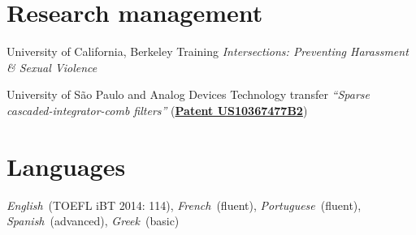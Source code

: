 \documentclass{cvlfoc}
\begin{document}
\section*{Research management}

\begin{entrydate}
		{University of California, Berkeley}
		{Training}
		{\emph{Intersections: Preventing Harassment \& Sexual Violence}}

		{University of S\~{a}o Paulo {\normalfont and} Analog Devices}
		{Technology transfer}
		{\emph{``Sparse cascaded-integrator-comb filters''}
		(\href{https://patents.google.com/patent/US10367477B2}{\textbf{Patent US10367477B2}})}
\end{entrydate}



\section*{Languages}

\textit{English}~(TOEFL iBT 2014: 114),
\textit{French}~(fluent),
\textit{Portuguese}~(fluent),
\textit{Spanish}~(advanced),
\textit{Greek}~(basic)


\end{document}
